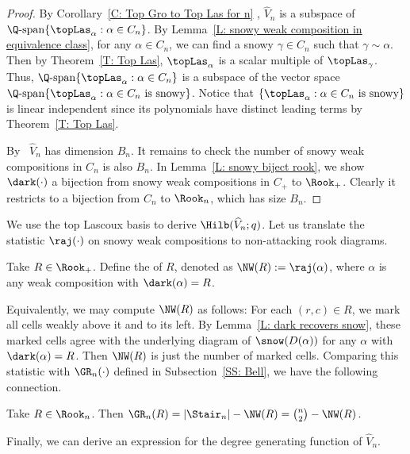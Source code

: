 \begin{proof}
By Corollary~\ref{C: Top Gro to Top Las for n} ,
$\widehat{V}_n$ is a subspace of 
$\Q\textrm{-span}\{\topLas_\alpha: \alpha \in C_n\}$.
By Lemma~\ref{L: snowy weak composition in equivalence class},
for any $\alpha \in C_n$,
we can find a snowy $\gamma \in C_n$
such that $\gamma \sim \alpha$.
Then by Theorem~\ref{T: Top Las},
$\topLas_\alpha$ is a scalar
multiple of $\topLas_\gamma$.
Thus, 
$\Q\textrm{-span}\{\topLas_\alpha: \alpha \in C_n\}$ is a subspace of the vector space 
$\Q\textrm{-span}\{\topLas_\alpha: \alpha \in C_n \textrm{ is snowy}\}$.
Notice that $\{\topLas_\alpha: \alpha \in C_n \textrm{ is snowy}\}$
is linear independent since its polynomials
have distinct leading terms 
by Theorem~\ref{T: Top Las}.

By~\cite[Theorem~1.4]{PSW}
$\widehat{V}_n$ has dimension $B_n$.
It remains to check the number of snowy weak compositions
in $C_n$ is also $B_n$.
In Lemma~\ref{L: snowy biject rook},
we show $\dark(\cdot)$ a bijection from
snowy weak compositions in $C_+$ to $\Rook_+$.
Clearly it restricts to a bijection from
$C_n$ to $\Rook_n$,
which has size $B_n$.
\end{proof}

We use the top Lascoux basis 
to derive $\Hilb(\widehat{V}_n; q)$. 
Let us translate 
the statistic $\raj(\cdot)$ 
on snowy weak compositions
to non-attacking rook diagrams.

\begin{defn}
Take $R \in \Rook_+$.
Define the  of $R$,
denoted as $\NW(R) := \raj(\alpha)$, 
where $\alpha$ is any weak composition
with $\dark(\alpha) = R$.
\end{defn}

Equivalently, we may compute $\NW(R)$ as follows:
For each $(r,c) \in R$, we mark all cells
weakly above it and to its left.
By Lemma~\ref{L: dark recovers snow},
these marked cells agree with the underlying diagram of $\snow(D(\alpha))$ for any $\alpha$ with $\dark(\alpha) = R$.
Then $\NW(R)$ is just the number of marked cells.
Comparing this statistic with $\GR_n(\cdot)$
defined in Subsection~\ref{SS: Bell},
we have the following connection.

\begin{rem}
\label{R: NW and GR}
Take $R \in \Rook_n$.
Then $\GR_n(R) = |\Stair_n| - \NW(R) = {\binom{n}{2}} - \NW(R)$.
\end{rem}

Finally, we can derive an expression
for the degree generating function of $\widehat{V}_n$.

